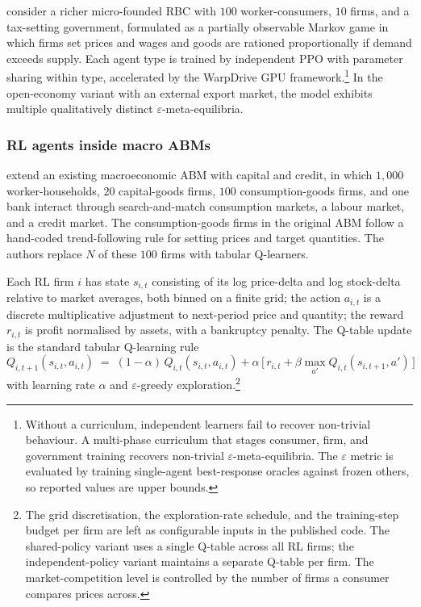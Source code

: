 \citet{Curry2022marl} consider a richer micro-founded RBC with $100$
worker-consumers, $10$ firms, and a tax-setting government,
formulated as a partially observable Markov game in which firms set
prices and wages and goods are rationed proportionally if demand
exceeds supply. Each agent type is trained by independent PPO with
parameter sharing within type, accelerated by the WarpDrive GPU
framework.\footnote{Without a curriculum, independent learners fail
to recover non-trivial behaviour. A multi-phase curriculum that
stages consumer, firm, and government training recovers non-trivial
$\varepsilon$-meta-equilibria. The $\varepsilon$ metric is evaluated
by training single-agent best-response oracles against frozen others,
so reported values are upper bounds.} In the open-economy variant
with an external export market, the model exhibits multiple
qualitatively distinct $\varepsilon$-meta-equilibria.

\subsubsection{RL agents inside macro ABMs}
\label{sec:macro:rmabm}

\citet{Brusatin2024rmabm} extend an existing macroeconomic ABM with
capital and credit, in which $1{,}000$ worker-households, $20$
capital-goods firms, $100$ consumption-goods firms, and one bank
interact through search-and-match consumption markets, a labour
market, and a credit market. The consumption-goods firms in the
original ABM follow a hand-coded trend-following rule for setting
prices and target quantities. The authors replace $N$ of these $100$
firms with tabular Q-learners.

Each RL firm $i$ has state $s_{i,t}$
consisting of its log price-delta and log stock-delta relative to
market averages, both binned on a finite grid; the action $a_{i,t}$
is a discrete multiplicative adjustment to next-period price and
quantity; the reward $r_{i,t}$ is profit normalised by assets, with
a bankruptcy penalty. The Q-table update is the standard tabular
Q-learning rule
\begin{equation}
Q_{i,t+1}(s_{i,t}, a_{i,t}) \;=\; (1 - \alpha)\, Q_{i,t}(s_{i,t}, a_{i,t}) + \alpha\,\bigl[\, r_{i,t} + \beta \max_{a'} Q_{i,t}(s_{i,t+1}, a')\,\bigr]
\label{eq:macro:rmabm-q}
\end{equation}
with learning rate $\alpha$ and $\varepsilon$-greedy
exploration.\footnote{The grid discretisation, the exploration-rate
schedule, and the training-step budget per firm are left as
configurable inputs in the published code. The shared-policy variant
uses a single Q-table across all RL firms; the independent-policy
variant maintains a separate Q-table per firm. The market-competition
level is controlled by the number of firms a consumer compares
prices across.}

